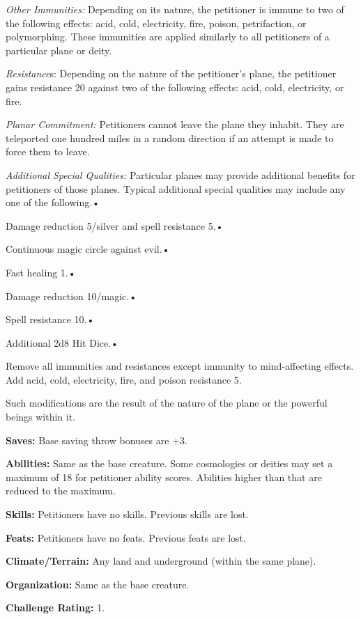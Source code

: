 \documentclass{article}
\begin{document}
\textit{Other Immunities: }Depending on its nature, the petitioner is immune to 
two of the following effects: acid, cold, electricity, fire, poison, petrifaction, 
or polymorphing. These immunities are applied similarly to all petitioners of a 
particular plane or deity.

\textit{Resistance}s: Depending on the nature of the petitioner's plane, the petitioner 
gains resistance 20 against two of the following effects: acid, cold, electricity, 
or fire.

\textit{Planar Commitment: }Petitioners cannot leave the plane they inhabit. They 
are teleported one hundred miles in a random direction if an attempt is made to 
force them to leave.

\textit{Additional Special Qualities: }Particular planes may provide additional 
benefits for petitioners of those planes. Typical additional special qualities 
may include any one of the following.• 

\parindent=3pt
Damage reduction 5/silver and spell resistance 5.• 

Continuous magic circle against evil.• 

\parindent=7pt
Fast healing 1.• 

\parindent=3pt
Damage reduction 10/magic.• 

Spell resistance 10.• 

\parindent=7pt
Additional 2d8 Hit Dice.• 

\parindent=3pt
Remove all immunities and resistances except immunity to mind-affecting effects. 
Add acid, cold, electricity, fire, and poison resistance 5.

\parindent=0pt
Such modifications are the result of the nature of the plane or the powerful beings 
within it.

\textbf{Saves:} Base saving throw bonuses are +3.

\textbf{Abilities:} Same as the base creature. Some cosmologies or deities may 
set a maximum of 18 for petitioner ability scores. Abilities higher than that are 
reduced to the maximum.

\textbf{Skills: }Petitioners have no skills. Previous skills are lost.

\textbf{Feats: }Petitioners have no feats. Previous feats are lost.

\textbf{Climate/Terrain:} Any land and underground (within the same plane).

\textbf{Organization: }Same as the base creature.

\textbf{Challenge Rating:} 1.
\end{document}
